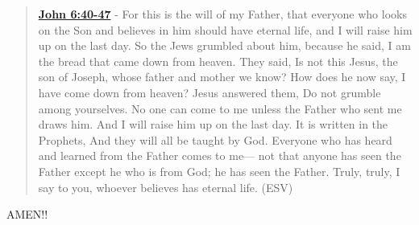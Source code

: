 \documentclass[11pt]{article}
\begin{document}
\begin{quote}
\textbf{\href{https://www.biblegateway.com/passage/?search=John\%206\%3A40-47\&version=ESV}{John 6:40-47}} - For this is the will of my Father, that everyone who looks on the Son and believes in him should have eternal life, and I will raise him up on the last day. So the Jews grumbled about him, because he said, I am the bread that came down from heaven. They said, Is not this Jesus, the son of Joseph, whose father and mother we know? How does he now say, I have come down from heaven? Jesus answered them, Do not grumble among yourselves. No one can come to me unless the Father who sent me draws him. And I will raise him up on the last day. It is written in the Prophets, And they will all be taught by God. Everyone who has heard and learned from the Father comes to me— not that anyone has seen the Father except he who is from God; he has seen the Father. Truly, truly, I say to you, whoever believes has eternal life. (ESV)
\end{quote}

AMEN!!
\end{document}
